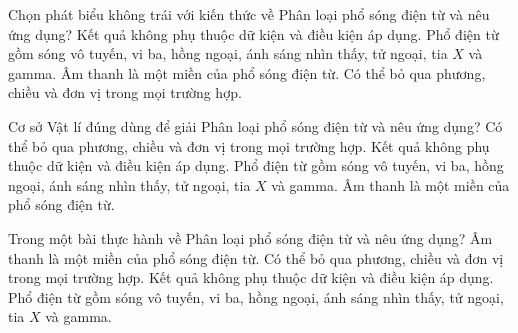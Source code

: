 \begin{ex}
Chọn phát biểu không trái với kiến thức về Phân loại phổ sóng điện từ và nêu ứng dụng?
\choice
{Kết quả không phụ thuộc dữ kiện và điều kiện áp dụng.}
{\True Phổ điện từ gồm sóng vô tuyến, vi ba, hồng ngoại, ánh sáng nhìn thấy, tử ngoại, tia $X$ và gamma.}
{Âm thanh là một miền của phổ sóng điện từ.}
{Có thể bỏ qua phương, chiều và đơn vị trong mọi trường hợp.}
\end{ex}

\begin{ex}
Cơ sở Vật lí đúng dùng để giải Phân loại phổ sóng điện từ và nêu ứng dụng?
\choice
{Có thể bỏ qua phương, chiều và đơn vị trong mọi trường hợp.}
{Kết quả không phụ thuộc dữ kiện và điều kiện áp dụng.}
{\True Phổ điện từ gồm sóng vô tuyến, vi ba, hồng ngoại, ánh sáng nhìn thấy, tử ngoại, tia $X$ và gamma.}
{Âm thanh là một miền của phổ sóng điện từ.}
\end{ex}

\begin{ex}
Trong một bài thực hành về Phân loại phổ sóng điện từ và nêu ứng dụng?
\choice
{Âm thanh là một miền của phổ sóng điện từ.}
{Có thể bỏ qua phương, chiều và đơn vị trong mọi trường hợp.}
{Kết quả không phụ thuộc dữ kiện và điều kiện áp dụng.}
{\True Phổ điện từ gồm sóng vô tuyến, vi ba, hồng ngoại, ánh sáng nhìn thấy, tử ngoại, tia $X$ và gamma.}
\end{ex}


